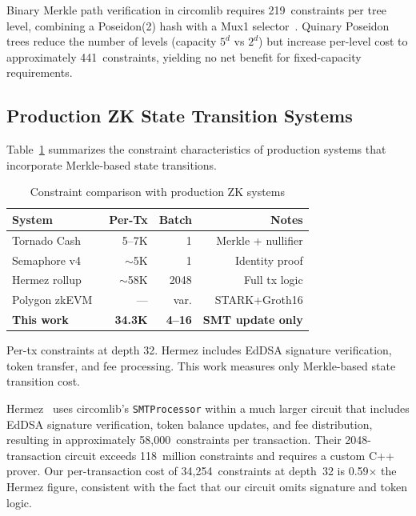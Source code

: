 Binary Merkle path verification in circomlib requires 219~constraints per
tree level, combining a Poseidon(2) hash with a Mux1
selector~\cite{elamrani2020merkle}. Quinary Poseidon trees reduce the
number of levels (capacity $5^d$ vs $2^d$) but increase per-level cost to
approximately 441~constraints, yielding no net benefit for fixed-capacity
requirements.

\subsection{Production ZK State Transition Systems}

Table~\ref{tab:production-comparison} summarizes the constraint characteristics
of production systems that incorporate Merkle-based state transitions.

\begin{table}[htbp]
\centering
\caption{Constraint comparison with production ZK systems}
\label{tab:production-comparison}
\begin{tabular}{@{}lrrr@{}}
\toprule
\textbf{System} & \textbf{Per-Tx} & \textbf{Batch} & \textbf{Notes} \\
\midrule
Tornado Cash~\cite{tornadocash2019} & 5--7K & 1 & Merkle + nullifier \\
Semaphore v4~\cite{semaphore2024v4} & $\sim$5K & 1 & Identity proof \\
Hermez rollup~\cite{hermez2021circuits} & $\sim$58K & 2048 & Full tx logic \\
Polygon zkEVM~\cite{polygon2024zkevm} & --- & var. & STARK+Groth16 \\
\textbf{This work} & \textbf{34.3K} & \textbf{4--16} & \textbf{SMT update only} \\
\bottomrule
\end{tabular}
\par\vspace{1mm}
\parbox{\columnwidth}{\footnotesize Per-tx constraints at depth 32. Hermez includes EdDSA signature
verification, token transfer, and fee processing. This work measures only
Merkle-based state transition cost.}
\end{table}
\FloatBarrier

Hermez~\cite{hermez2021circuits} uses circomlib's \texttt{SMTProcessor}
within a much larger circuit that includes EdDSA signature verification,
token balance updates, and fee distribution, resulting in approximately
58,000~constraints per transaction. Their 2048-transaction circuit
exceeds 118~million constraints and requires a custom C++ prover.
Our per-transaction cost of 34,254~constraints at depth~32 is 0.59$\times$
the Hermez figure, consistent with the fact that our circuit omits
signature and token logic.

